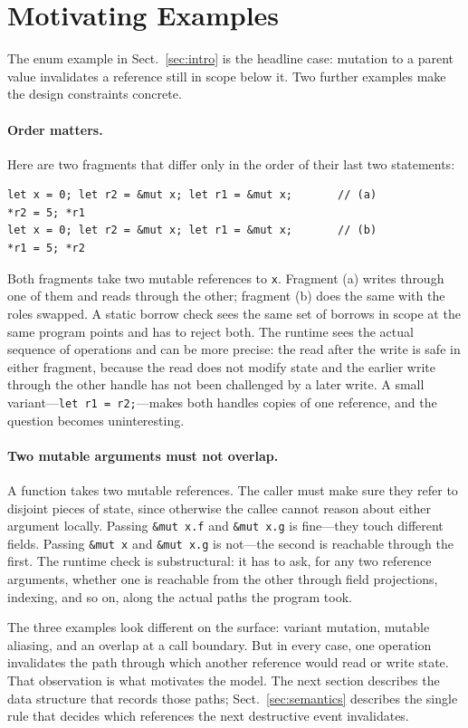 \section{Motivating Examples}\label{sec:examples}

The enum example in Sect.~\ref{sec:intro} is the headline case:
mutation to a parent value invalidates a reference still in scope
below it. Two further examples make the design constraints concrete.

\paragraph{Order matters.}
Here are two fragments that differ only in the order of their last
two statements:
\begin{lstlisting}
let x = 0; let r2 = &mut x; let r1 = &mut x;       // (a)
*r2 = 5; *r1
let x = 0; let r2 = &mut x; let r1 = &mut x;       // (b)
*r1 = 5; *r2
\end{lstlisting}
Both fragments take two mutable references to \texttt{x}. Fragment
(a) writes through one of them and reads through the other; fragment
(b) does the same with the roles swapped. A static borrow check sees
the same set of borrows in scope at the same program points and has
to reject both. The runtime sees the actual sequence of operations
and can be more precise: the read after the write is safe in either
fragment, because the read does not modify state and the earlier
write through the other handle has not been challenged by a later
write. A small variant---\texttt{let r1 = r2;}---makes both handles
copies of one reference, and the question becomes uninteresting.

\paragraph{Two mutable arguments must not overlap.}
A function takes two mutable references. The caller must make sure
they refer to disjoint pieces of state, since otherwise the callee
cannot reason about either argument locally. Passing
\texttt{\&mut x.f} and \texttt{\&mut x.g} is fine---they touch
different fields. Passing \texttt{\&mut x} and \texttt{\&mut x.g} is
not---the second is reachable through the first. The runtime check is
substructural: it has to ask, for any two reference arguments, whether
one is reachable from the other through field projections,
indexing, and so on, along the actual paths the program took.

\medskip

The three examples look different on the surface: variant mutation,
mutable aliasing, and an overlap at a call boundary. But in every
case, one operation invalidates the path through which another
reference would read or write state. That observation is what
motivates the model. The next section describes the data structure
that records those paths; Sect.~\ref{sec:semantics} describes the
single rule that decides which references the next destructive event
invalidates.
